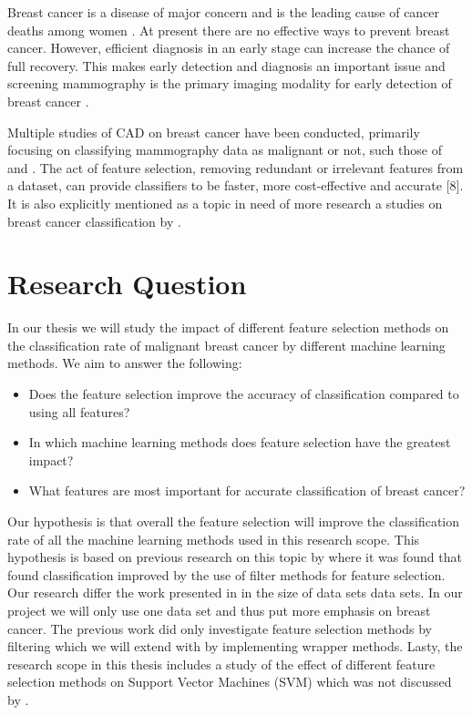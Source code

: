 \documentclass{kththesis}
\begin{document}
Breast cancer is a disease of major concern and is the leading cause of cancer deaths among women \parencite{althuis2005}. At present there are no effective ways to prevent breast cancer. However, efficient diagnosis in an early stage can increase the chance of full recovery. This makes early detection and diagnosis an important issue and screening mammography is the primary imaging modality for early detection of breast cancer \parencite{tabar2002}.

Multiple studies of CAD on breast cancer have been conducted, primarily focusing on classifying mammography data as malignant or not, such those of \textcite{ramos2012} and \textcite{akay2009}. The act of feature selection, removing redundant or irrelevant features from a dataset, can provide classifiers to be faster, more cost-effective and accurate [8]. It is also explicitly mentioned as a topic in need of more research a studies on breast cancer classification by \textcite{akin2011}.

\section{Research Question}

In our thesis we will study the impact of different feature selection methods on the classification rate of malignant breast cancer by different machine learning methods. We aim to answer the following:

\begin{itemize}
  \item Does the feature selection improve the accuracy of classification compared to using all features?
  \item In which machine learning methods does feature selection have the greatest impact?
  \item What features are most important for accurate classification of breast cancer?
\end{itemize}
   Our hypothesis is that overall the feature selection will improve the classification rate of all the machine learning methods used in this research scope. This hypothesis is based on previous research on this topic by \textcite{karabulut2012} where it was found that found classification improved by the use of filter methods for feature selection.
Our research differ the work presented in \parencite{karabulut2012} in the size of data sets data sets. In our project we will only use one data set and thus put more emphasis on breast cancer. The previous work did only investigate feature selection methods by filtering which we will extend with by implementing wrapper methods. Lasty, the research scope in this thesis includes a study of the effect of different feature selection methods on Support Vector Machines (SVM) which was not discussed by \parencite{karabulut2012}.
\end{document}
